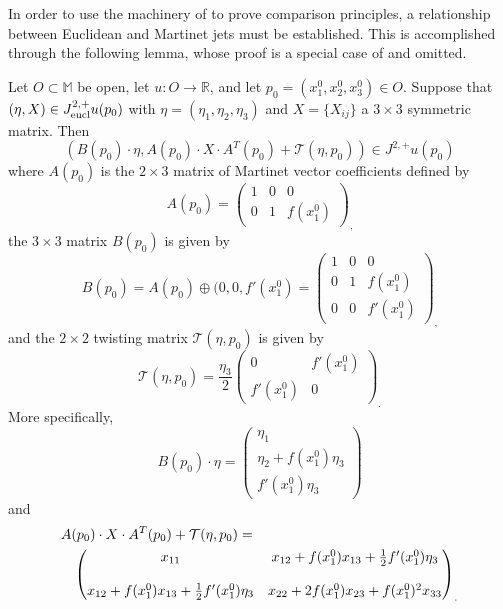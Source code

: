 \documentclass[reqno]{amsart}
\begin{document}
In order to use the machinery of \cite{CIL:UGTVS} to prove comparison principles, a relationship between Euclidean and Martinet jets must be established. This is accomplished through the following lemma, whose proof is a special case of \cite[Corollary 3.2]{B:MP} and omitted. 

\begin{lemma}\label{twlemma}
Let $O\subset \mathbb{M}$ be open, let $u: O\to\mathbb{R}$, and let $p_0=(x_1^0,x_2^0,x_3^0) \in O$. Suppose that $(\eta, X)\in J^{2,+}_{\textmd{eucl}} u(p_0)$ with $\eta=(\eta_1,\eta_2,\eta_3)$ and $X=\{X_{ij}\}$ a $3\times 3$ symmetric matrix. Then 
\begin{equation}\label{twisty}
(B(p_0)\cdot \eta, A(p_0)\cdot X\cdot A^T(p_0)+\mathcal{T}(\eta,p_0))\in J^{2,+} u(p_0)
\end{equation}
where $A(p_0)$ is the $2\times3$ matrix of Martinet vector coefficients defined by
\[A(p_0)=\begin{pmatrix}1&0&0\\0&1&f(x_1^0)\end{pmatrix}_,\]
the $3\times 3$ matrix $B(p_0)$ is given by 
\[B(p_0)=A(p_0)\oplus(0,0,f'(x_1^0)=\begin{pmatrix}1&0&0\\0&1&f(x_1^0)\\0&0&f'(x_1^0) \end{pmatrix}_,\]
and the $2\times2$ twisting matrix $\mathcal{T}(\eta,p_0)$ is given by
\[\mathcal{T}(\eta,p_0)=\frac{\eta_3}{2}\begin{pmatrix}0&f'(x_1^0)\\
f'(x_1^0)&0\end{pmatrix}_.\]
More specifically,
\[B(p_0)\cdot\eta=\begin{pmatrix}
\eta_1\\
\eta_2+f(x_1^0)\eta_3\\
f'(x_1^0)\eta_3
\end{pmatrix}\]
and 
\begin{eqnarray*}
\lefteqn{A(p_0)\cdot X\cdot A^T(p_0)+\mathcal{T}(\eta,p_0)=} & & \\
& & \begin{pmatrix}x_{11}&x_{12}+f(x_1^0)x_{13}+\frac{1}{2}f'(x_1^0)\eta_3\\
\mbox{} & \mbox{} \\
x_{12}+f(x_1^0)x_{13}+\frac{1}{2}f'(x_1^0)\eta_3&x_{22}+2f(x_1^0)x_{23}+f(x_1^0)^2x_{33}\end{pmatrix}_.
\end{eqnarray*}
\end{lemma}
\end{document}
